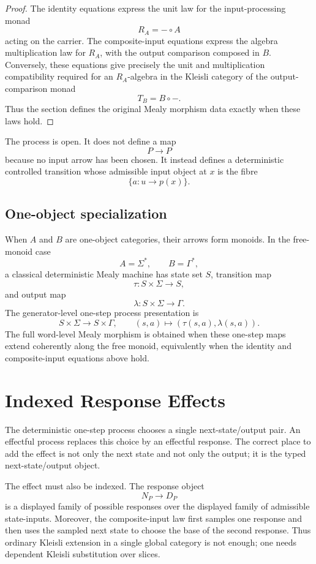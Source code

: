 \begin{proof}
The identity equations express the unit law for the input-processing monad
\[
R_A=-\circ A
\]
acting on the carrier.  The composite-input equations express the algebra multiplication law for
\(R_A\), with the output comparison composed in \(B\).  Conversely, these equations give precisely
the unit and multiplication compatibility required for an \(R_A\)-algebra in the Kleisli category
of the output-comparison monad
\[
T_B=B\circ - .
\]
Thus the section defines the original Mealy morphism data exactly when these laws hold.
\end{proof}

The process is open.  It does not define a map
\[
P\to P
\]
because no input arrow has been chosen.  It instead defines a deterministic controlled transition
whose admissible input object at \(x\) is the fibre
\[
\{a:u\to p(x)\}.
\]

\subsection{One-object specialization}
\label{subsec:one-object-deterministic-process-specialization}

When \(A\) and \(B\) are one-object categories, their arrows form monoids.  In the free-monoid
case
\[
A=\Sigma^\ast,
\qquad
B=\Gamma^\ast,
\]
a classical deterministic Mealy machine has state set \(S\), transition map
\[
\tau:S\times \Sigma\to S,
\]
and output map
\[
\lambda:S\times \Sigma\to \Gamma .
\]
The generator-level one-step process presentation is
\[
S\times \Sigma\to S\times \Gamma,
\qquad
(s,a)\mapsto(\tau(s,a),\lambda(s,a)).
\]
The full word-level Mealy morphism is obtained when these one-step maps extend coherently along
the free monoid, equivalently when the identity and composite-input equations above hold.

\section{Indexed Response Effects}
\label{sec:indexed-response-effects}

The deterministic one-step process chooses a single next-state/output pair.  An effectful process
replaces this choice by an effectful response.  The correct place to add the effect is not only the
next state and not only the output; it is the typed next-state/output object.

The effect must also be indexed.  The response object
\[
N_P\to D_P
\]
is a displayed family of possible responses over the displayed family of admissible state-inputs.
Moreover, the composite-input law first samples one response and then uses the sampled next state
to choose the base of the second response.  Thus ordinary Kleisli extension in a single global
category is not enough; one needs dependent Kleisli substitution over slices.

